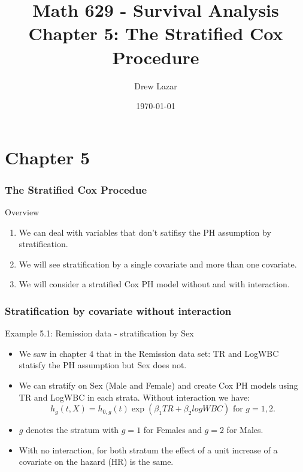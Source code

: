 \documentclass{beamer}
\title{Math 629 - Survival Analysis \\ Chapter 5: The Stratified Cox Procedure}
\author{Drew Lazar}
\institute{Ball State University}
\date{\today}
\theoremstyle{definition}
\begin{document}
\begin{frame}
    \titlepage
\end{frame}



\section{Chapter 5}
\begin{frame}
\frametitle{The Stratified Cox Procedue}
\begin{block}{Overview}
\begin{enumerate}
\item We can deal with variables that don't satifisy the PH assumption by stratification.
\item We will see stratification by a single covariate and more than one covariate.
\item We will consider a stratified Cox PH model without and with interaction.
\end{enumerate}
\end{block}
\end{frame}

\begin{frame}
\frametitle{Stratification by covariate without interaction}
\begin{block}{Example 5.1: Remission data - stratification by Sex}
\begin{itemize}
\item We saw in chapter 4 that in the Remission data set: TR and LogWBC statisfy the PH assumption but Sex does not.
\item We can stratify on Sex (Male and Female) and create Cox PH models using TR and LogWBC in each strata. Without interaction we have:
\[
h_g(t,X) = h_{0,g}(t)\exp(\beta_1 TR + \beta_2 logWBC) \text{ for } g=1,2.
\]
\item $g$ denotes the stratum with $g=1$ for Females and $g=2$ for Males.
\item With no interaction, for both stratum the effect of a unit increase of a covariate on the hazard (HR) is the same.
\end{itemize}
\end{block}
\end{frame}
\end{document}
